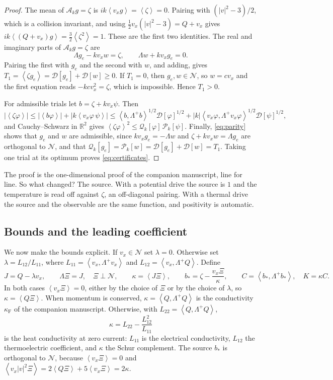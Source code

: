 \documentclass[11pt]{article}
\newcommand{\av}[1]{\left\langle #1\right\rangle}
\newcommand{\D}{\mathcal D}
\newcommand{\A}{\mathcal A}
\newcommand{\N}{\mathcal N}
\newcommand{\Q}{\mathcal Q}
\renewcommand{\P}{\mathcal P}
\newcommand{\kap}{\kappa}
\newcommand{\RR}{\mathbb R}
\newcommand{\dual}[1]{\left\langle #1,\Lambda^+ #1\right\rangle}
\theoremstyle{definition}
\theoremstyle{remark}
\numberwithin{equation}{section}
\begin{document}
\begin{proof}
The mean of $\A_kg=\zeta$ is $ik\av{v_xg}=\av\zeta=0$. Pairing with
$(|v|^2-3)/2$, which is a collision invariant, and using
$\tfrac12v_x(|v|^2-3)=Q+v_x$ gives $ik\av{(Q+v_x)g}=\tfrac32\av{\zeta^2}=1$.
These are the first two identities. The real and imaginary parts of
$\A_kg=\zeta$ are
\begin{equation}
 \Lambda g_e-kv_xw=\zeta,\qquad \Lambda w+kv_xg_e=0 .
 \label{eq:parity}
\end{equation}
Pairing the first with $g_e$ and the second with $w$, and adding, gives
$T_1=\av{\zeta g_e}=\D[g_e]+\D[w]\geq0$. If $T_1=0$, then $g_e,w\in\N$,
so $w=cv_x$ and the first equation reads $-kcv_x^2=\zeta$, which is
impossible. Hence $T_1>0$.

For admissible trials let $b=\zeta+kv_x\psi$. Then
\[
 |\av{\zeta\varphi}|\leq|\av{b\varphi}|+|k\av{v_x\varphi\,\psi}|
 \leq\dual b^{1/2}\D[\varphi]^{1/2}
      +|k|\dual{v_x\varphi}^{1/2}\D[\psi]^{1/2},
\]
and Cauchy--Schwarz in $\RR^2$ gives
$\av{\zeta\varphi}^2\leq\Q_k[\varphi]\,\P_k[\psi]$. Finally,
\eqref{eq:parity} shows that $g_e$ and $w$ are admissible, since
$kv_xg_e=-\Lambda w$ and $\zeta+kv_xw=\Lambda g_e$ are orthogonal to $\N$,
and that $\Q_k[g_e]=\P_k[w]=\D[g_e]+\D[w]=T_1$. Taking one trial at its
optimum proves \eqref{eq:certificates}.
\end{proof}

The proof is the one-dimensional proof of the companion manuscript,
line for line. So what changed? The source. With a potential drive the
source is $1$ and the temperature is read off against $\zeta$, an
off-diagonal pairing. With a thermal drive the source and the observable
are the same function, and positivity is automatic.

\subsection{Bounds and the leading coefficient}

We now make the bounds explicit. If $v_x\in\N$ set $\lambda=0$. Otherwise
set $\lambda=L_{12}/L_{11}$, where
$L_{11}=\dual{v_x}$ and $L_{12}=\av{v_x,\Lambda^+Q}$. Define
\begin{equation}
 J=Q-\lambda v_x,\qquad \Lambda\Xi=J,\quad\Xi\perp\N,\qquad
 \kap=\av{J\Xi},\qquad
 b_*=\zeta-\frac{v_x\Xi}{\kap},\qquad C=\dual{b_*},\quad K=\kap C .
 \label{eq:constants}
\end{equation}
In both cases $\av{v_x\Xi}=0$, either by the choice of $\Xi$ or by the
choice of $\lambda$, so $\kap=\av{Q\Xi}$. When momentum is conserved,
$\kap=\av{Q,\Lambda^+Q}$ is the conductivity $\kappa_{\mathrm F}$ of the
companion manuscript. Otherwise, with $L_{22}=\dual Q$,
\begin{equation}
 \kap=L_{22}-\frac{L_{12}^2}{L_{11}}
 \label{eq:schur}
\end{equation}
is the heat conductivity at zero current: $L_{11}$ is the electrical
conductivity, $L_{12}$ the thermoelectric coefficient, and $\kap$ the
Schur complement. The source $b_*$ is orthogonal to $\N$, because
$\av{v_x\Xi}=0$ and $\av{v_x|v|^2\Xi}=2\av{Q\Xi}+5\av{v_x\Xi}=2\kap$.
\end{document}
